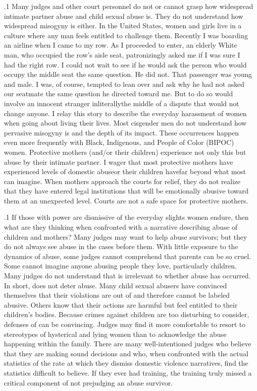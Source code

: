 \documentclass[11pt, twoside]{article}
\begin{document}
{\p.1{%
\raggedbottom{}\vspace*{1pt}
Many judges and other court personnel do not or cannot grasp how
widespread intimate partner abuse and child sexual abuse is. They do not
understand how widespread misogyny is either. In the United States, women
and girls live in a culture where any man feels entitled to challenge them.
Recently I was boarding an airline when I came to my row. As I proceeded to enter, an elderly White man, who occupied the row's aisle seat,
patronizingly asked me if I was sure I had the right row. I could not wait
to see if he would ask the person who would occupy the middle seat the
same question. He did not. That passenger was young and male. I was, of
course, tempted to lean over and ask why he had not asked our seatmate
the same question he directed toward me. But to do so would involve an
innocent stranger in\mdash{}literally\mdash{}the middle of a dispute that would not
change anyone. I relay this story to describe the everyday harassment of
women when going about living their lives. Most cisgender men do not
understand how pervasive misogyny is and the depth of its impact. These
occurrences happen even more frequently with Black, Indigenous, and
People of Color (BIPOC) women. Protective mothers (and/or their children) experience not only this  but abuse by their
intimate partner. I wager that most protective mothers have experienced
levels of domestic abuse\mdash{}or their children have\mdash{}far beyond what most
can imagine. When mothers approach the courts for relief, they do not
realize that they have entered legal institutions that will be emotionally
abusive toward them at an unexpected level. Courts are not a safe space
for protective mothers.
} %

\p.1{%
If those with power are dismissive of the everyday slights women endure, then what are they thinking when confronted with a narrative
describing abuse of children and mothers? Many judges may want to
help abuse survivors; but they do not always see abuse in the cases before
them. With little exposure to the dynamics of abuse, some judges cannot
comprehend that parents can be so cruel. Some cannot imagine anyone abusing people they love, particularly children. Many judges do not
understand that  is irrelevant to whether abuse has occurred. In
short,  does not deter abuse. Many child sexual abusers have convinced themselves that their violations are out of  and therefore
cannot be labeled abusive. Others know that their actions are harmful
but feel entitled to their children's bodies. Because crimes against children are too disturbing to consider, defenses of  can be convincing. Judges may find it more
comfortable to resort to stereotypes of hysterical and lying women than
to acknowledge the abuse happening within the family. There are many
well-intentioned judges who believe that they are making sound decisions and who, when confronted with the actual statistics of the rate at
which they dismiss domestic violence narratives, find the statistics difficult to believe. If they ever had training, the training truly missed a
critical component of not prejudging an abuse survivor.
} %

}
\end{document}
